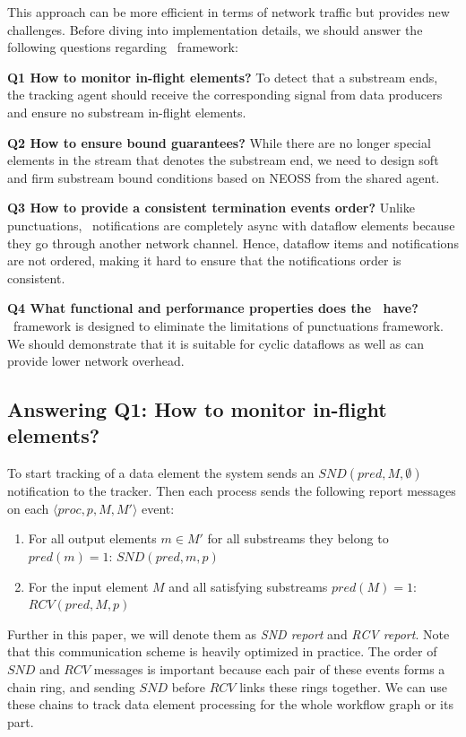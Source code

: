 This approach can be more efficient in terms of network traffic but provides new challenges. Before diving into implementation details, we should answer the following questions regarding \tracker\ framework:

{\bf Q1 How to monitor in-flight elements?} To detect that a substream ends, the tracking agent should receive the corresponding signal from data producers and ensure no substream in-flight elements. 

{\bf Q2 How to ensure bound guarantees?} While there are no longer special elements in the stream that denotes the substream end, we need to design soft and firm substream bound conditions based on NEOSS from the shared agent. 

{\bf Q3 How to provide a consistent termination events order?} Unlike punctuations, \tracker\ notifications are completely async with dataflow elements because they go through another network channel. Hence, dataflow items and notifications are not ordered, making it hard to ensure that the notifications order is consistent.

{\bf Q4 What functional and performance properties does the \tracker\ have?} \tracker\ framework is designed to eliminate the limitations of punctuations framework. We should demonstrate that it is suitable for cyclic dataflows as well as can provide lower network overhead.

\subsection{Answering Q1: How to monitor in-flight elements?}
To start tracking of a data element the system sends an $SND(pred, M, \emptyset)$ notification to the tracker. Then each process sends the following report messages on each $\langle proc, p, M, M' \rangle$ event:
\begin{enumerate}
    \item For all output elements $m \in M'$ for all substreams they belong to $pred(m) = 1$: $SND(pred, m, p)$
    \item For the input element $M$ and all satisfying substreams $pred(M) = 1$: $RCV(pred, M, p)$
\end{enumerate}
Further in this paper, we will denote them as {\em SND report} and {\em RCV report}. Note that this communication scheme is heavily optimized in practice. The order of $SND$ and $RCV$ messages is important because each pair of these events forms a chain ring, and sending $SND$ before $RCV$ links these rings together. We can use these chains to track data element processing for the whole workflow graph or its part.

